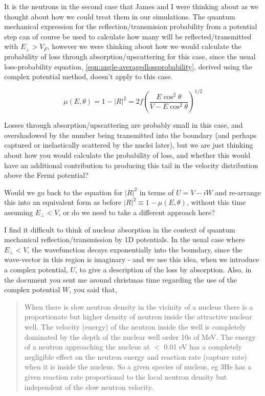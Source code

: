 \documentclass[11pt,a4paper,oneside]{article}
\begin{document}
It is the neutrons in the second case that James and I were thinking about as we thought about how we could treat them in our simulations. The quantum mechanical expression for the reflection/transmision probability from a potential step can of course be used to calculate how many will be reflected/transmitted with $E_{\perp} > V_{F}$, however we were thinking about how we would calculate the probability of loss through absorption/upscattering for this case, since the usual loss-probability equation, \ref{eqn:angle-averagedlossprobability}, derived using the complex potential method, doesn't apply to this case.  

\begin{equation}
\mu(E, \theta) = 1 - |R|^{2} = 2f \left( \frac{E\cos^{2}\theta}{V-E\cos^{2}\theta} \right)^{1/2}
\label{eqn:angle-averagedlossprobability}
\end{equation}

Losses through absorption/upscattering are probably small in this case, and overshadowed by the number being transmitted into the boundary (and perhaps captured or inelastically scattered by the nuclei later), but we are just thinking about how you would calculate the probability of loss, and whether this would have an additional contribution to producing this tail in the velocity distribution above the Fermi potential? 

Would we go back to the equation for $|R|^{2}$ in terms of $U = V - iW$ and re-arrange this into an equivalent form as before $|R|^{2} \equiv 1 - \mu(E,\theta)$, without this time assuming $E_{\perp} < V$, or do we need to take a different approach here?

I find it difficult to think of nuclear absorption in the context of quantum mechanical reflection/transmission by 1D potentials. In the usual case where $E_{\perp} < V$, the wavefunction decays exponentially into the boundary, since the wave-vector in this region is imaginary - and we use this idea, when we introduce a complex potential, $U$, to give a description of the loss by absorption. Also, in the document you sent me around christmas time regarding the use of the complex potential $W$, you said that, 

\begin{quote}
When there is slow neutron density in the vicinity of a nucleus there is a proportionate but higher density of neutron inside the attractive nuclear well. The velocity (energy) of the neutron inside the well is completely dominated by the depth of the nuclear well order 10s of MeV. The energy of a neutron approaching the nucleus at $<$ 0.01 eV has a completely negligible effect on the neutron energy and reaction rate (capture rate) when it is inside the nucleus. So a given species of nucleus, eg 3He has a given reaction rate proportional to the local
neutron density but independent of the slow neutron velocity.
\end{quote}
\end{document}

